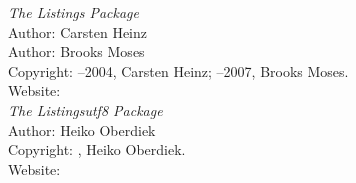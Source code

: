 \begin{thebibliography}{9}
\emph{The Listings Package}\\
Author: Carsten Heinz\\
Author: Brooks Moses\\
Copyright: \textcopyright{}–2004, Carsten Heinz; \textcopyright{}–2007, Brooks Moses.\\
Website: \\




\emph{The Listingsutf8 Package}\\
Author: Heiko Oberdiek\\
Copyright: \textcopyright{}, Heiko Oberdiek.\\
Website: \\





\end{thebibliography}